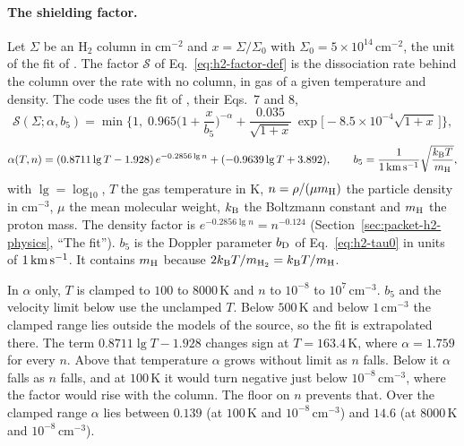 \paragraph{The shielding factor.} Let $\Sigma$ be an H$_2$ column in
cm$^{-2}$ and $x=\Sigma/\Sigma_0$ with $\Sigma_0=5\times10^{14}$\,cm$^{-2}$, the
unit of the fit of \citet{DraineBertoldi1996}. The factor $\mathcal S$ of
Eq.~\eqref{eq:h2-factor-def} is the dissociation rate behind the column over
the rate with no column, in gas of a given temperature and density. The code
uses the fit of \citet{WolcottGreenHaiman2019}, their Eqs.~7 and 8,
\begin{equation}
  \mathcal S(\Sigma;\alpha,b_5) = \min\!\Big\{1,\;
  0.965\Big(1+\frac{x}{b_5}\Big)^{-\alpha}
  + \frac{0.035}{\sqrt{1+x}}\,\exp\!\big[-8.5\times10^{-4}\sqrt{1+x}\,\big]\Big\},
  \label{eq:h2-factor}
\end{equation}
\begin{equation}
  \alpha(T,n) = (0.8711\lg T-1.928)\,e^{-0.2856\lg n}
  + (-0.9639\lg T+3.892), \qquad
  b_5=\frac{1}{1\,{\rm km\,s^{-1}}}\sqrt{\frac{k_{\rm B}T}{m_{\rm H}}},
  \label{eq:h2-exponent}
\end{equation}
with $\lg=\log_{10}$, $T$ the gas temperature in K, $n=\rho/(\mu m_{\rm H})$
the particle density in cm$^{-3}$, $\mu$ the mean molecular weight,
$k_{\rm B}$ the Boltzmann constant and $m_{\rm H}$ the proton mass. The
density factor is $e^{-0.2856\lg n}=n^{-0.124}$
(Section~\ref{sec:packet-h2-physics}, ``The fit''). $b_5$ is
the Doppler parameter $b_{\rm D}$ of Eq.~\eqref{eq:h2-tau0} in units of
$1\,{\rm km\,s^{-1}}$. It contains $m_{\rm H}$ because
$2k_{\rm B}T/m_{{\rm H}_2}=k_{\rm B}T/m_{\rm H}$.

In $\alpha$ only, $T$ is clamped to $100$ to $8000$\,K and $n$ to
$10^{-8}$ to $10^{7}$\,cm$^{-3}$. $b_5$ and the velocity limit below use the
unclamped $T$. Below $500$\,K and below $1$\,cm$^{-3}$ the clamped range lies
outside the models of the source, so the fit is extrapolated there. The term
$0.8711\lg T-1.928$ changes sign at $T=163.4$\,K, where $\alpha=1.759$ for
every $n$. Above that temperature $\alpha$ grows without limit as $n$ falls.
Below it $\alpha$ falls as $n$ falls, and at $100$\,K it would turn negative
just below $10^{-8}$\,cm$^{-3}$, where the factor would rise with the column.
The floor on $n$ prevents that. Over the clamped range $\alpha$ lies between
$0.139$ (at $100$\,K and $10^{-8}$\,cm$^{-3}$) and $14.6$ (at $8000$\,K and
$10^{-8}$\,cm$^{-3}$).

